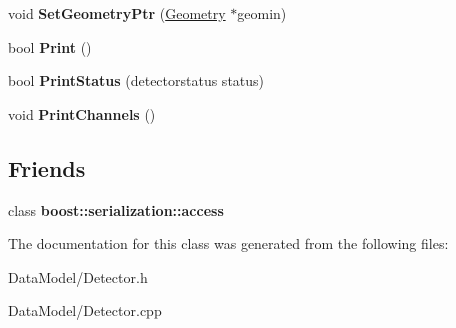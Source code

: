 \begin{DoxyCompactItemize}
\item 
\hypertarget{classDetector_a314120e55ef11500f7e0463e94ae37bb}{void {\bfseries Set\-Geometry\-Ptr} (\hyperlink{classGeometry}{Geometry} $\ast$geomin)}\label{classDetector_a314120e55ef11500f7e0463e94ae37bb}

\item 
\hypertarget{classDetector_a89a77c0af830a448ab599e9cfce4a2d8}{bool {\bfseries Print} ()}\label{classDetector_a89a77c0af830a448ab599e9cfce4a2d8}

\item 
\hypertarget{classDetector_a4fced6fd118fe1371ee7e7193c666710}{bool {\bfseries Print\-Status} (detectorstatus status)}\label{classDetector_a4fced6fd118fe1371ee7e7193c666710}

\item 
\hypertarget{classDetector_af25e30e52b653b1380743676322f88ea}{void {\bfseries Print\-Channels} ()}\label{classDetector_af25e30e52b653b1380743676322f88ea}

\end{DoxyCompactItemize}
\subsection*{Friends}
\begin{DoxyCompactItemize}
\item 
\hypertarget{classDetector_ac98d07dd8f7b70e16ccb9a01abf56b9c}{class {\bfseries boost\-::serialization\-::access}}\label{classDetector_ac98d07dd8f7b70e16ccb9a01abf56b9c}

\end{DoxyCompactItemize}


The documentation for this class was generated from the following files\-:\begin{DoxyCompactItemize}
\item 
Data\-Model/Detector.\-h\item 
Data\-Model/Detector.\-cpp\end{DoxyCompactItemize}
